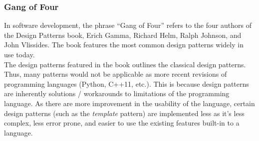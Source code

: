 \begin{multicols}{2}
\subsubsection{Gang of Four} %

In software development, the phrase ``Gang of Four'' refers to the four authors of the Design Patterns book, Erich Gamma, Richard Helm, Ralph Johnson, and John Vlissides\cite{gof-wiki}\cite{gof}. The book features the most common design patterns widely in use today.\bs
\\
The design patterns featured in the book outlines the classical design patterns. Thus, many patterns would not be applicable as more recent revisions of programming languages (Python, C++11, etc.). This is because design patterns are inherently solutions / workarounds to limitations of the programming language. As there are more improvement in the usability of the language, certain design patterns (such as the \textit{template} pattern) are implemented less as it's less complex, less error prone, and easier to use the existing features built-in to a language.


\iftwocolumns
\end{multicols}
\fi